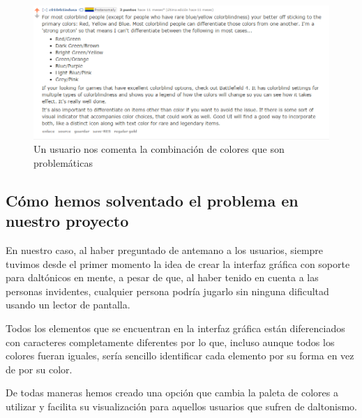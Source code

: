 \begin{figure}[H]
		\includegraphics[width=\textwidth,height=\textheight,keepaspectratio]{./img/redditcolorblind3.png}
	\caption{Un usuario nos comenta la combinación de colores que son problemáticas}
	\label{fig:roomsgamecolorblind3}
\end{figure}

\subsection{Cómo hemos solventado el problema en nuestro proyecto}
\label{sec:solventadodaltonicos}

En nuestro caso, al haber preguntado de antemano a los usuarios, siempre tuvimos desde el primer momento la idea de crear la interfaz gráfica con soporte para daltónicos en mente, a pesar de que, al haber tenido en cuenta a las personas invidentes, cualquier persona podría jugarlo sin ninguna dificultad usando un lector de pantalla.

Todos los elementos que se encuentran en la interfaz gráfica están diferenciados con caracteres completamente diferentes por lo que, incluso aunque todos los colores fueran iguales, sería sencillo identificar cada elemento por su forma en vez de por su color. 

De todas maneras hemos creado una opción que cambia la paleta de colores a utilizar y facilita su visualización para aquellos usuarios que sufren de daltonismo.

